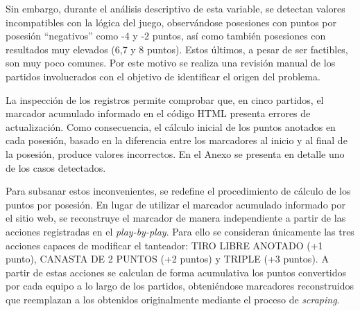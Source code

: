 \documentclass[
  12pt,
]{article}
\begin{document}
\begin{table}[H]
\centering
\caption{\label{tab:unnamed-chunk-13}Ejemplo de estructura con una fila por posesión}
\centering
{}
\end{table}

Sin embargo, durante el análisis descriptivo de esta variable, se
detectan valores incompatibles con la lógica del juego, observándose
posesiones con puntos por posesión ``negativos'' como -4 y -2 puntos,
así como también posesiones con resultados muy elevados (6,7 y 8
puntos). Estos últimos, a pesar de ser factibles, son muy poco comunes.
Por este motivo se realiza una revisión manual de los partidos
involucrados con el objetivo de identificar el origen del problema.

La inspección de los registros permite comprobar que, en cinco partidos,
el marcador acumulado informado en el código HTML presenta errores de
actualización. Como consecuencia, el cálculo inicial de los puntos
anotados en cada posesión, basado en la diferencia entre los marcadores
al inicio y al final de la posesión, produce valores incorrectos. En el
Anexo se presenta en detalle uno de los casos detectados.

Para subsanar estos inconvenientes, se redefine el procedimiento de
cálculo de los puntos por posesión. En lugar de utilizar el marcador
acumulado informado por el sitio web, se reconstruye el marcador de
manera independiente a partir de las acciones registradas en el
\emph{play-by-play}. Para ello se consideran únicamente las tres
acciones capaces de modificar el tanteador: TIRO LIBRE ANOTADO (+1
punto), CANASTA DE 2 PUNTOS (+2 puntos) y TRIPLE (+3 puntos). A partir
de estas acciones se calculan de forma acumulativa los puntos
convertidos por cada equipo a lo largo de los partidos, obteniéndose
marcadores reconstruidos que reemplazan a los obtenidos originalmente
mediante el proceso de \emph{scraping}.
\end{document}
